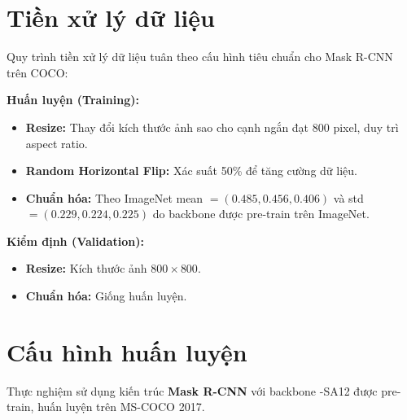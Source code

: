 \section{Tiền xử lý dữ liệu}
\label{sec:preprocessing}

Quy trình tiền xử lý dữ liệu tuân theo cấu hình tiêu chuẩn cho Mask R-CNN trên COCO:

\textbf{Huấn luyện (Training):}
\begin{itemize}
    \item \textbf{Resize:} Thay đổi kích thước ảnh sao cho cạnh ngắn đạt $800$ pixel, duy trì aspect ratio.
    \item \textbf{Random Horizontal Flip:} Xác suất 50\% để tăng cường dữ liệu.
    \item \textbf{Chuẩn hóa:} Theo ImageNet mean $= (0.485, 0.456, 0.406)$ và std $= (0.229, 0.224, 0.225)$ do backbone được pre-train trên ImageNet.
\end{itemize}

\textbf{Kiểm định (Validation):}
\begin{itemize}
    \item \textbf{Resize:} Kích thước ảnh $800 \times 800$.
    \item \textbf{Chuẩn hóa:} Giống huấn luyện.
\end{itemize}

\section{Cấu hình huấn luyện}
\label{sec:training_config}

Thực nghiệm sử dụng kiến trúc \textbf{Mask R-CNN} với backbone \fastvit{}-SA12 được pre-train, huấn luyện trên MS-COCO 2017.

